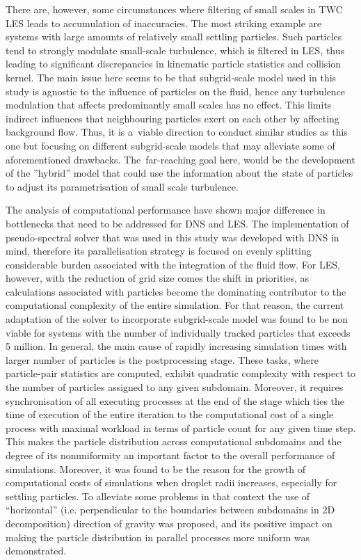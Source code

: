 \documentclass{pracamgren}
\begin{document}
There are, however, some circumstances where filtering of small scales in TWC LES leads to accumulation of inaccuracies.
The most striking example are systems with large amounts of relatively small settling particles.
Such particles tend to strongly modulate small-scale turbulence, which is filtered in LES, thus leading to significant discrepancies in kinematic particle statistics and collision kernel.
The main issue here seems to be that subgrid-scale model used in this study is agnostic to the influence of particles on the fluid, hence any turbulence modulation that affects predominantly small scales has no effect.
This limits indirect influences that neighbouring particles exert on each other by affecting background flow.
Thus, it is a~viable direction to conduct similar studies as this one but focusing on different subgrid-scale models that may alleviate some of aforementioned drawbacks.
The~far-reaching goal here, would be the development of the ''hybrid'' model that could use the information about the~state of particles to adjust its parametrisation of small scale turbulence.

The analysis of computational performance have shown major difference in bottlenecks that need to be addressed for DNS and LES.
The implementation of pseudo-spectral solver that was used in this study was developed with DNS in mind, therefore its parallelisation strategy is focused on evenly splitting considerable burden associated with the integration of the fluid flow.
For LES, however, with the reduction of grid size comes the shift in priorities, as calculations associated with particles become the dominating contributor to the computational complexity of the entire simulation.
For that reason, the current adaptation of the solver to incorporate subgrid-scale model was found to be non viable for systems with the number of individually tracked particles that exceeds 5 million.
In general, the main cause of rapidly increasing simulation times with larger number of particles is the postprocessing stage.
These tasks, where particle-pair statistics are computed, exhibit quadratic complexity with respect to the number of particles assigned to any given subdomain.
Moreover, it requires synchronisation of all executing processes at the end of the stage which ties the time of execution of the entire iteration to the computational cost of a single process with maximal workload in terms of particle count for any given time step.
This makes the particle distribution across computational subdomains and the degree of its nonuniformity an important factor to the overall performance of simulations.
Moreover, it was found to be the reason for the growth of computational costs of simulations when droplet radii increases, especially for settling particles.
To alleviate some problems in that context the use of ``horizontal'' (i.e. perpendicular to the boundaries between subdomains in 2D decomposition) direction of gravity was proposed, and its positive impact on making the particle distribution in parallel processes more uniform was demonstrated.
\end{document}
